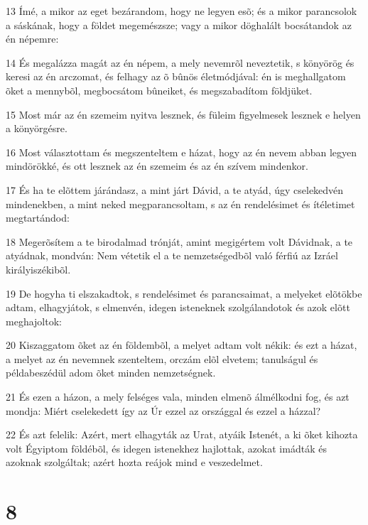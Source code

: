 \par 13 Ímé, a mikor az eget bezárandom, hogy ne legyen esõ; és a mikor parancsolok a sáskának, hogy a földet megemészsze; vagy a mikor döghalált bocsátandok az én népemre:
\par 14 És megalázza magát az én népem, a mely nevemrõl neveztetik, s könyörög és keresi az én arczomat, és felhagy az õ bûnös életmódjával: én is meghallgatom õket a mennybõl, megbocsátom bûneiket, és megszabadítom földjüket.
\par 15 Most már az én szemeim nyitva lesznek, és füleim figyelmesek lesznek e helyen a könyörgésre.
\par 16 Most választottam és megszenteltem e házat, hogy az én nevem abban legyen mindörökké, és ott lesznek az én szemeim és az én szívem mindenkor.
\par 17 És ha te elõttem járándasz, a mint járt Dávid, a te atyád, úgy cselekedvén mindenekben, a mint neked megparancsoltam, s az én rendelésimet és ítéletimet megtartándod:
\par 18 Megerõsítem a te birodalmad trónját, amint megigértem volt Dávidnak, a te atyádnak, mondván: Nem vétetik el a te nemzetségedbõl való férfiú az Izráel királyiszékibõl.
\par 19 De hogyha ti elszakadtok, s rendelésimet és parancsaimat, a melyeket elõtökbe adtam, elhagyjátok, s elmenvén, idegen isteneknek szolgálandotok és azok elõtt meghajoltok:
\par 20 Kiszaggatom õket az én földembõl, a melyet adtam volt nékik: és ezt a házat, a melyet az én nevemnek szenteltem, orczám elõl elvetem; tanulságul és példabeszédül adom õket minden nemzetségnek.
\par 21 És ezen a házon, a mely felséges vala, minden elmenõ álmélkodni fog, és azt mondja: Miért cselekedett így az Úr ezzel az országgal és ezzel a házzal?
\par 22 És azt felelik: Azért, mert elhagyták az Urat, atyáik Istenét, a ki õket kihozta volt Égyiptom földébõl, és idegen istenekhez hajlottak, azokat imádták és azoknak szolgáltak; azért hozta reájok mind e veszedelmet.

\chapter{8}

